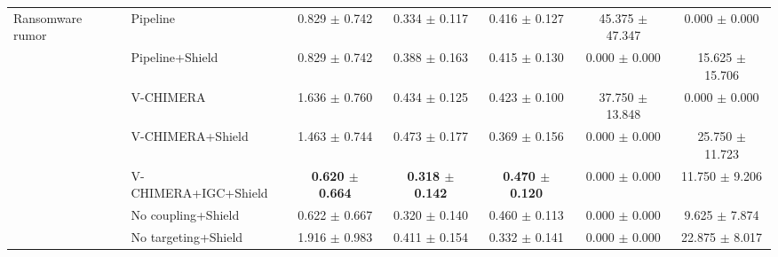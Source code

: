 \begin{tabular}{llccccc}
\midrule
\multirow{7}{*}{Ransomware rumor} & Pipeline & 0.829 $\pm$ 0.742 & 0.334 $\pm$ 0.117 & 0.416 $\pm$ 0.127 & 45.375 $\pm$ 47.347 & 0.000 $\pm$ 0.000 \\
 & Pipeline+Shield & 0.829 $\pm$ 0.742 & 0.388 $\pm$ 0.163 & 0.415 $\pm$ 0.130 & 0.000 $\pm$ 0.000 & 15.625 $\pm$ 15.706 \\
 & V-CHIMERA & 1.636 $\pm$ 0.760 & 0.434 $\pm$ 0.125 & 0.423 $\pm$ 0.100 & 37.750 $\pm$ 13.848 & 0.000 $\pm$ 0.000 \\
 & V-CHIMERA+Shield & 1.463 $\pm$ 0.744 & 0.473 $\pm$ 0.177 & 0.369 $\pm$ 0.156 & 0.000 $\pm$ 0.000 & 25.750 $\pm$ 11.723 \\
 & V-CHIMERA+IGC+Shield & \textbf{0.620 $\pm$ 0.664} & \textbf{0.318 $\pm$ 0.142} & \textbf{0.470 $\pm$ 0.120} & 0.000 $\pm$ 0.000 & 11.750 $\pm$ 9.206 \\
 & No coupling+Shield & 0.622 $\pm$ 0.667 & 0.320 $\pm$ 0.140 & 0.460 $\pm$ 0.113 & 0.000 $\pm$ 0.000 & 9.625 $\pm$ 7.874 \\
 & No targeting+Shield & 1.916 $\pm$ 0.983 & 0.411 $\pm$ 0.154 & 0.332 $\pm$ 0.141 & 0.000 $\pm$ 0.000 & 22.875 $\pm$ 8.017 \\
\bottomrule
\end{tabular}
